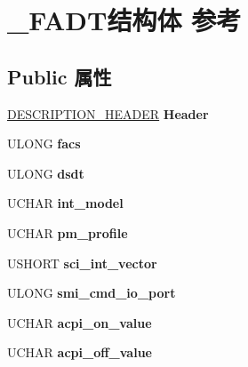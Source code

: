 \hypertarget{struct___f_a_d_t}{}\section{\+\_\+\+F\+A\+D\+T结构体 参考}
\label{struct___f_a_d_t}
\subsection*{Public 属性}
\begin{DoxyCompactItemize}
\item 
\mbox{\label{struct___f_a_d_t_a8df1275aab10162c229a32d2e27633ca}} 
\hyperlink{struct___d_e_s_c_r_i_p_t_i_o_n___h_e_a_d_e_r}{D\+E\+S\+C\+R\+I\+P\+T\+I\+O\+N\+\_\+\+H\+E\+A\+D\+ER} {\bfseries Header}
\item 
\mbox{\label{struct___f_a_d_t_a61145c2367c2ae1e9b2e881675934578}} 
U\+L\+O\+NG {\bfseries facs}
\item 
\mbox{\label{struct___f_a_d_t_a93ce4c637ef03429c26ee41fbe5c8d3b}} 
U\+L\+O\+NG {\bfseries dsdt}
\item 
\mbox{\label{struct___f_a_d_t_a83abf9c18e7d8269ac9e2454d33148c7}} 
U\+C\+H\+AR {\bfseries int\+\_\+model}
\item 
\mbox{\label{struct___f_a_d_t_a417d8b8bf1a8c7461b7f031af5fe5f63}} 
U\+C\+H\+AR {\bfseries pm\+\_\+profile}
\item 
\mbox{\label{struct___f_a_d_t_ae3ceecbd5cb8effd945acf3c1965ea15}} 
U\+S\+H\+O\+RT {\bfseries sci\+\_\+int\+\_\+vector}
\item 
\mbox{\label{struct___f_a_d_t_ad463baa97d72ff9a51a7a7bc9a77f91c}} 
U\+L\+O\+NG {\bfseries smi\+\_\+cmd\+\_\+io\+\_\+port}
\item 
\mbox{\label{struct___f_a_d_t_a688d07bc63b0dd08aafe239d37e97e98}} 
U\+C\+H\+AR {\bfseries acpi\+\_\+on\+\_\+value}
\item 
\mbox{\label{struct___f_a_d_t_a946f0608caa7a2b3dd2a5ad61f6e9876}} 
U\+C\+H\+AR {\bfseries acpi\+\_\+off\+\_\+value}

\end{DoxyCompactItemize}
